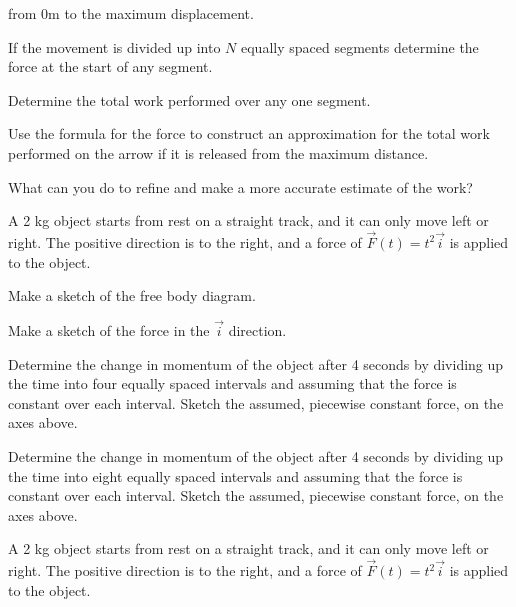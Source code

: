 \begin{problem}
\begin{subproblem}
      from 0m to the maximum displacement.
      \vfill
      \clearpage
    \item If the movement is divided up into $N$ equally spaced segments
      determine the force at the start of any segment.
      \vfill
    \item Determine the total work performed over any one segment.
      \vfill
    \item Use the formula for the force to construct an approximation
      for the total work performed on the arrow if it is released from
      the maximum distance.
      \vfill
    \item What can you do to refine and make a more accurate estimate of
      the work?
    \end{subproblem}
  \item A 2 kg object starts from rest on a straight track, and it can
    only move left or right. The positive direction is to the right, and
    a force of $\vec{F}(t)=t^2 \vec{i}$ is applied to the object.

  \begin{subproblem}
    \item Make a sketch of the free body diagram.
      \vspace{4em}
    \item Make a sketch of the force in the $\vec{i}$ direction. \\
      \scalebox{0.5}{}

    \item Determine the change in momentum of the object after 4
      seconds by dividing up the time into four equally spaced
      intervals and assuming that the force is constant over each
      interval. Sketch the assumed, piecewise constant force, on the
      axes above.
      \vfill
    \item Determine the change in momentum of the object after 4
      seconds by dividing up the time into eight equally spaced
      intervals and assuming that the force is constant over each
      interval. Sketch the assumed, piecewise constant force, on the
      axes above.
      \vfill
  \end{subproblem}

  \clearpage

\item A 2 kg object starts from rest on a straight track, and it can
  only move left or right. The positive direction is to the right, and
  a force of $\vec{F}(t)=t^2 \vec{i}$ is applied to the object.


\end{problem}

